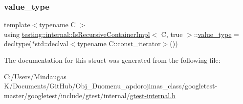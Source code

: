 \mbox{\label{structtesting_1_1internal_1_1_is_recursive_container_impl_3_01_c_00_01true_01_4_a5e8e2cf58f0d2581e9e3ab5f5630cd61}} 
\subsubsection{\texorpdfstring{value\_type}{value\_type}\hspace{0.1cm}{\footnotesize\ttfamily [2/2]}}
{\footnotesize\ttfamily template$<$typename C $>$ \\
using \mbox{\hyperlink{structtesting_1_1internal_1_1_is_recursive_container_impl}{testing\+::internal\+::\+Is\+Recursive\+Container\+Impl}}$<$ C, true $>$\+::\mbox{\hyperlink{structtesting_1_1internal_1_1_is_recursive_container_impl_3_01_c_00_01true_01_4_a5e8e2cf58f0d2581e9e3ab5f5630cd61}{value\+\_\+type}} =  decltype($\ast$std\+::declval$<$typename C\+::const\+\_\+iterator$>$())}



The documentation for this struct was generated from the following file\+:\begin{DoxyCompactItemize}
\item 
C\+:/\+Users/\+Mindaugas K/\+Documents/\+Git\+Hub/\+Obj\+\_\+\+Duomenu\+\_\+apdorojimas\+\_\+class/googletest-\/master/googletest/include/gtest/internal/\mbox{\hyperlink{googletest-master_2googletest_2include_2gtest_2internal_2gtest-internal_8h}{gtest-\/internal.\+h}}\end{DoxyCompactItemize}
